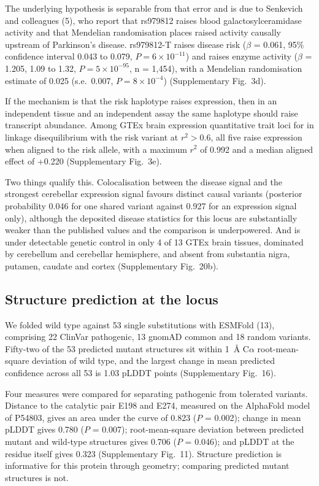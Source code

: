 \documentclass[10pt]{article}
\begin{document}
The underlying hypothesis is separable from that error and is due to Senkevich and colleagues (5), who report that rs979812 raises blood galactosylceramidase activity and that Mendelian
randomisation places raised activity causally upstream of Parkinson's disease. rs979812-T raises
disease risk ($\beta$ = 0.061, 95\% confidence interval 0.043 to 0.079, $P = 6\times10^{-11}$)
and raises enzyme activity ($\beta$ = 1.205, 1.09 to 1.32, $P = 5\times10^{-95}$, n = 1,454), with
a Mendelian randomisation estimate of 0.025 (s.e.\ 0.007, $P = 8\times10^{-4}$) (Supplementary Fig.~3d).

If the mechanism is that the risk haplotype raises  expression, then in an independent
tissue and an independent assay the same haplotype should raise  transcript abundance.
Among GTEx brain expression quantitative trait loci for
 in linkage disequilibrium with the risk variant at $r^2 > 0.6$, all five raise
 expression when aligned to the risk allele, with a maximum $r^2$ of 0.992 and a median
aligned effect of +0.220 (Supplementary Fig.~3e).

Two things qualify this. Colocalisation between the disease signal and the strongest cerebellar
expression signal favours distinct causal variants (posterior probability 0.046 for one shared
variant against 0.927 for an expression signal only), although the deposited disease statistics
for this locus are substantially weaker than the published values and the comparison is underpowered. And  is under detectable genetic control in only 4 of
13 GTEx brain tissues, dominated by cerebellum and cerebellar hemisphere, and absent from
substantia nigra, putamen, caudate and cortex (Supplementary Fig.~20b).

\subsection*{Structure prediction at the  locus}

We folded  wild type against 53 single substitutions with ESMFold (13), comprising 22 ClinVar
pathogenic, 13 gnomAD common and 18 random variants. Fifty-two of the 53 predicted mutant
structures sit within 1~\AA{} C$\alpha$ root-mean-square deviation of wild type, and the largest
change in mean predicted confidence across all 53 is 1.03 pLDDT points (Supplementary Fig.~16).

Four measures were compared for separating pathogenic from tolerated variants. Distance to the
catalytic pair E198 and E274, measured on the AlphaFold model of P54803, gives an area under the
curve of 0.823 ($P$ = 0.002); change in mean pLDDT gives 0.780 ($P$ = 0.007); root-mean-square
deviation between predicted mutant and wild-type structures gives 0.706 ($P$ = 0.046); and pLDDT at
the residue itself gives 0.323 (Supplementary Fig.~11). Structure prediction is informative for this protein through geometry; comparing predicted mutant structures is not.
\end{document}
